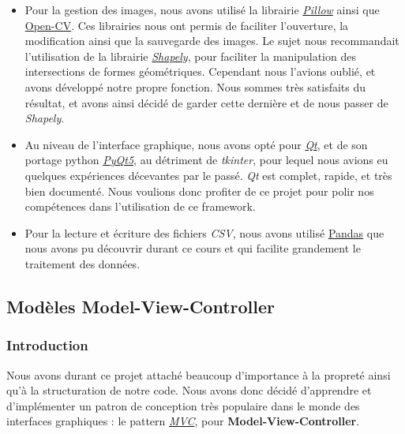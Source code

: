 \documentclass{rapport}
\begin{document}
            \begin{itemize}
                \item Pour la gestion des images, nous avons utilisé la librairie \href{https://pillow.readthedocs.io/en/stable/}{\textit{Pillow}} ainsi que \href{https://pillow.readthedocs.io/en/stable/}{Open-CV}. Ces librairies nous ont permis de faciliter l'ouverture, la modification ainsi que la sauvegarde des images. Le sujet nous recommandait l'utilisation de la librairie \href{https://pillow.readthedocs.io/en/stable/}{\textit{Shapely}}, pour faciliter la manipulation des intersections de formes géométriques. Cependant nous l'avions oublié, et avons développé notre propre fonction. Nous sommes très satisfaits du résultat, et avons ainsi décidé de garder cette dernière et de nous passer de \textit{Shapely}.

                \item Au niveau de l'interface graphique, nous avons opté pour \href{https://www.qt.io/}{\textit{Qt}}, et de son portage python \href{https://pypi.org/project/PyQt5/}{\textit{PyQt5}}, au détriment de \textit{tkinter}, pour lequel nous avions eu quelques expériences décevantes par le passé. \textit{Qt} est complet, rapide, et très bien documenté. Nous voulions donc profiter de ce projet pour polir nos compétences dans l'utilisation de ce framework.

                \item Pour la lecture et écriture des fichiers \textit{CSV}, nous avons utilisé \href{https://pandas.pydata.org/}{Pandas} que nous avons pu découvrir durant ce cours et qui facilite grandement le traitement des données.
            \end{itemize}   
        
        \subsection{Modèles Model-View-Controller}
        
            \subsubsection{Introduction}
            Nous avons durant ce projet attaché beaucoup d'importance à la propreté ainsi qu'à la structuration de notre code. Nous avons donc décidé d'apprendre et d'implémenter un patron de conception très populaire dans le monde des interfaces graphiques : le pattern \href{https://en.wikipedia.org/wiki/Model\%E2\%80\%93view\%E2\%80\%93controller}{\textit{MVC}}, pour \textbf{Model-View-Controller}.
        
\end{document}
